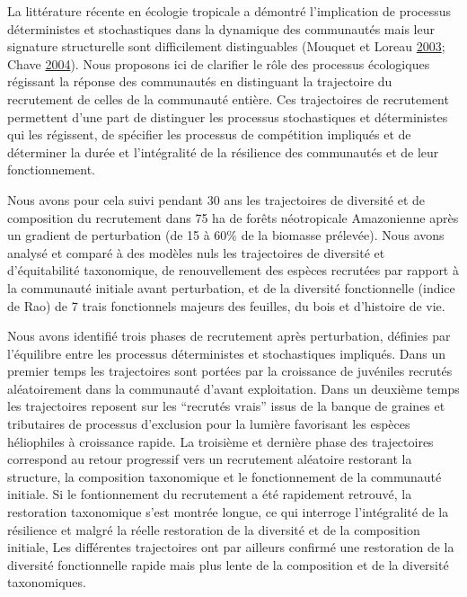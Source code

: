 \documentclass[11pt,french,A4paper,extrafontsizes,onecolumn,openright]{memoir}
\begin{document}
La littérature récente en écologie tropicale a démontré l'implication de
processus déterministes et stochastiques dans la dynamique des
communautés mais leur signature structurelle sont difficilement
distinguables (Mouquet et Loreau
\protect\hyperlink{ref-Mouquet2003}{2003}; Chave
\protect\hyperlink{ref-Chave2004}{2004}). Nous proposons ici de
clarifier le rôle des processus écologiques régissant la réponse des
communautés en distinguant la trajectoire du recrutement de celles de la
communauté entière. Ces trajectoires de recrutement permettent d'une
part de distinguer les processus stochastiques et déterministes qui les
régissent, de spécifier les processus de compétition impliqués et de
déterminer la durée et l'intégralité de la résilience des communautés et
de leur fonctionnement.

Nous avons pour cela suivi pendant 30 ans les trajectoires de diversité
et de composition du recrutement dans 75 ha de forêts néotropicale
Amazonienne après un gradient de perturbation (de 15 à 60\% de la
biomasse prélevée). Nous avons analysé et comparé à des modèles nuls les
trajectoires de diversité et d'équitabilité taxonomique, de
renouvellement des espèces recrutées par rapport à la communauté
initiale avant perturbation, et de la diversité fonctionnelle (indice de
Rao) de 7 trais fonctionnels majeurs des feuilles, du bois et d'histoire
de vie.

Nous avons identifié trois phases de recrutement après perturbation,
définies par l'équilibre entre les processus déterministes et
stochastiques impliqués. Dans un premier temps les trajectoires sont
portées par la croissance de juvéniles recrutés aléatoirement dans la
communauté d'avant exploitation. Dans un deuxième temps les trajectoires
reposent sur les ``recrutés vrais'' issus de la banque de graines et
tributaires de processus d'exclusion pour la lumière favorisant les
espèces héliophiles à croissance rapide. La troisième et dernière phase
des trajectoires correspond au retour progressif vers un recrutement
aléatoire restorant la structure, la composition taxonomique et le
fonctionnement de la communauté initiale. Si le fontionnement du
recrutement a été rapidement retrouvé, la restoration taxonomique s'est
montrée longue, ce qui interroge l'intégralité de la résilience et
malgré la réelle restoration de la diversité et de la composition
initiale, Les différentes trajectoires ont par ailleurs confirmé une
restoration de la diversité fonctionnelle rapide mais plus lente de la
composition et de la diversité taxonomiques.
\end{document}
